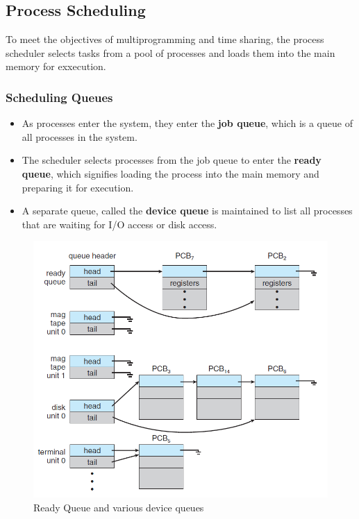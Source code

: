 \documentclass{article}
\theoremstyle{plain}
\theoremstyle{definition}
\begin{document}
\subsection{Process Scheduling}
To meet the objectives of multiprogramming and time sharing, the process scheduler selects tasks from a pool of processes and loads them into the main memory for exxecution. 
\subsubsection{Scheduling Queues}
\begin{itemize}
    \item As processes enter the system, they enter the \textbf{job queue}, which is a queue of all processes in the system.
    
    \item The scheduler selects processes from the job queue to enter the \textbf{ready queue}, which signifies loading the process into the main memory and preparing it for execution.
    
    \item A separate queue, called the \textbf{device queue} is maintained to list all processes that are waiting for I/O access or disk access.
\end{itemize}
\begin{figure}[ht]
    \centering
    \includegraphics[scale=0.45]{os15.png}
    \caption{Ready Queue and various device queues}
    \label{fig:my_label_xxx}
\end{figure}
\end{document}
